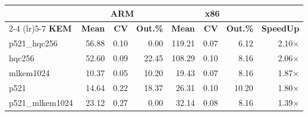 \begin{table}[!ht]
\begin{tabular}{lrrr|rrr|r}
 \toprule
& \multicolumn{3}{c}{\bfseries ARM} & \multicolumn{3}{c}{\bfseries x86} &\\
\cmidrule(lr){2-4} \cmidrule(lr){5-7}
\textbf{KEM} & \textbf{Mean} & \textbf{CV} & \textbf{Out.\%} & \textbf{Mean} & \textbf{CV} & \textbf{Out.\%} & \textbf{SpeedUp}\\
\midrule
p521_hqc256 & 56.88 & 0.10 & 0.00 & 119.21 & 0.07 & 6.12 & 2.10× \\
hqc256 & 52.60 & 0.09 & 22.45 & 108.29 & 0.10 & 8.16 & 2.06× \\
mlkem1024 & 10.37 & 0.05 & 10.20 & 19.43 & 0.07 & 8.16 & 1.87× \\
p521 & 14.64 & 0.22 & 18.37 & 26.31 & 0.10 & 10.20 & 1.80× \\
p521_mlkem1024 & 23.12 & 0.27 & 0.00 & 32.14 & 0.08 & 8.16 & 1.39× \\
\bottomrule
\end{tabular}
\end{table}
